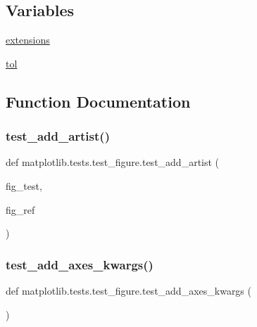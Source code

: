 \subsection*{Variables}
\begin{DoxyCompactItemize}
\item 
\hyperlink{namespacematplotlib_1_1tests_1_1test__figure_ab29cdcb123ec8d3e32682fef866bf66a}{extensions}
\item 
\hyperlink{namespacematplotlib_1_1tests_1_1test__figure_a74a4cc16e85855643fb5d0130bba0c50}{tol}
\end{DoxyCompactItemize}


\subsection{Function Documentation}
\mbox{\label{namespacematplotlib_1_1tests_1_1test__figure_a205afd7ef4436d7fa100b1db41d8a5e6}} 
\subsubsection{\texorpdfstring{test\+\_\+add\+\_\+artist()}{test\_add\_artist()}}
{\footnotesize\ttfamily def matplotlib.\+tests.\+test\+\_\+figure.\+test\+\_\+add\+\_\+artist (\begin{DoxyParamCaption}\item[{}]{fig\+\_\+test,  }\item[{}]{fig\+\_\+ref }\end{DoxyParamCaption})}

\mbox{\label{namespacematplotlib_1_1tests_1_1test__figure_af9dadb5b3f90b3804c466b0ffe5b49c5}} 
\subsubsection{\texorpdfstring{test\+\_\+add\+\_\+axes\+\_\+kwargs()}{test\_add\_axes\_kwargs()}}
{\footnotesize\ttfamily def matplotlib.\+tests.\+test\+\_\+figure.\+test\+\_\+add\+\_\+axes\+\_\+kwargs (\begin{DoxyParamCaption}{ }\end{DoxyParamCaption})}

